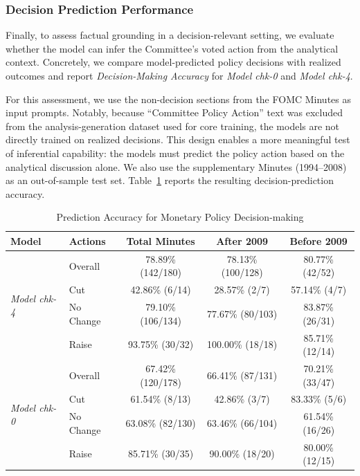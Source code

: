 
\subsubsection*{Decision Prediction Performance}

Finally, to assess factual grounding in a decision-relevant setting, we evaluate whether the model can infer the Committee’s voted action from the analytical context. Concretely, we compare model-predicted policy decisions with realized outcomes and report \textit{Decision-Making Accuracy} for \textit{Model chk-0} and \textit{Model chk-4}.


For this assessment, we use the non-decision sections from the FOMC Minutes as input prompts. Notably, because ``Committee Policy Action'' text was excluded from the analysis-generation dataset used for core training, the models are not directly trained on realized decisions. This design enables a more meaningful test of inferential capability: the models must predict the policy action based on the analytical discussion alone. We also use the supplementary Minutes (1994--2008) as an out-of-sample test set. Table~\ref{tab:ch2:decision_acc} reports the resulting decision-prediction accuracy.


\begin{table}[htp]
    \centering
    \footnotesize
    \begin{tabular}{l l c c c}
        \toprule
        \textbf{Model} & \textbf{Actions} & \textbf{Total Minutes} & \textbf{After 2009} & \textbf{Before 2009} \\
        \midrule
        \multirow{4}{*}{\textit{Model chk-4}} 
            & Overall     & 78.89\% (142/180) & 78.13\% (100/128) & 80.77\% (42/52) \\
            & Cut         & 42.86\% (6/14)    & 28.57\% (2/7)     & 57.14\% (4/7) \\
            & No Change   & 79.10\% (106/134) & 77.67\% (80/103)  & 83.87\% (26/31) \\
            & Raise       & 93.75\% (30/32)   & 100.00\% (18/18)  & 85.71\% (12/14) \\
        \midrule
        \multirow{4}{*}{\textit{Model chk-0}} 
            & Overall     & 67.42\% (120/178) & 66.41\% (87/131)  & 70.21\% (33/47) \\
            & Cut         & 61.54\% (8/13)    & 42.86\% (3/7)     & 83.33\% (5/6) \\
            & No Change   & 63.08\% (82/130)  & 63.46\% (66/104)  & 61.54\% (16/26) \\
            & Raise       & 85.71\% (30/35)   & 90.00\% (18/20)   & 80.00\% (12/15) \\
        \bottomrule
    \end{tabular}
    \caption{Prediction Accuracy for Monetary Policy Decision-making}
    \label{tab:ch2:decision_acc}
\end{table}



